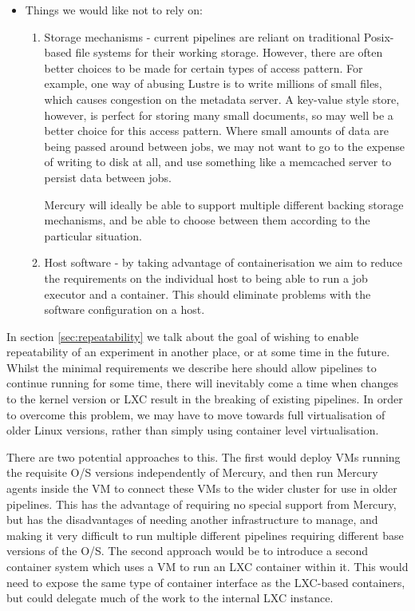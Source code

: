 \documentclass[10pt,a4paper]{article}
\newcommand{\npar}{\par\noindent\space}
\begin{document}
\begin{itemize}
\begin{enumerate}
\end{enumerate}
\item Things we would like not to rely on:
\begin{enumerate}
\item Storage mechanisms - current pipelines are reliant on traditional Posix-based file systems for their working storage. However, there are often better choices to be made for certain types of access pattern. For example, one way of abusing Lustre is to write millions of small files, which causes congestion on the metadata server. A key-value style store, however, is perfect for storing many small documents, so may well be a better choice for this access pattern. Where small amounts of data are being passed around between jobs, we may not want to go to the expense of writing to disk at all, and use something like a memcached server to persist data between jobs.

Mercury will ideally be able to support multiple different backing storage mechanisms, and be able to choose between them according to the particular situation.
\item Host software - by taking advantage of containerisation we aim to reduce the requirements on the individual host to being able to run a job executor and a container. This should eliminate problems with the software configuration on a host.
\end{enumerate}
\end{itemize}
\npar In section \ref{sec:repeatability} we talk about the goal of wishing to enable repeatability of an experiment in another place, or at some time in the future. Whilst the minimal requirements we describe here should allow pipelines to continue running for some time, there will inevitably come a time when changes to the kernel version or LXC result in the breaking of existing pipelines. In order to overcome this problem, we may have to move towards full virtualisation of older Linux versions, rather than simply using container level virtualisation.
\npar There are two potential approaches to this. The first would deploy VMs running the requisite O/S versions independently of Mercury, and then run Mercury agents inside the VM to connect these VMs to the wider cluster for use in older pipelines. This has the advantage of requiring no special support from Mercury, but has the disadvantages of needing another infrastructure to manage, and making it very difficult to run multiple different pipelines requiring different base versions of the O/S. The second approach would be to introduce a second container system which uses a VM to run an LXC container within it. This would need to expose the same type of container interface as the LXC-based containers, but could delegate much of the work to the internal LXC instance.
\end{document}
